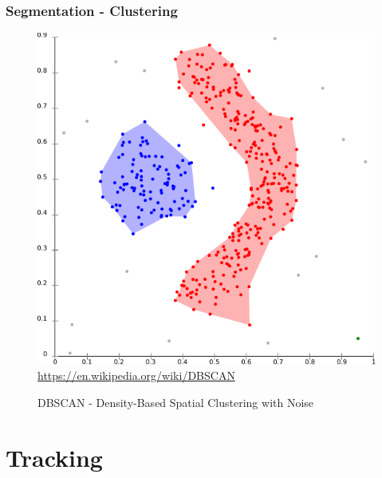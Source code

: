 \documentclass[nosymbols]{beamer}	%
\begin{document}
\begin{frame}
\frametitle{Segmentation - Clustering}
\begin{figure}[!ht]
\begin{center}
\caption{DBSCAN - Density-Based Spatial Clustering with Noise}
\includegraphics[width=\textwidth,height=0.7\textheight,keepaspectratio]{bilder/DBSCAN-density-data.pdf}\\
\tiny{\url{https://en.wikipedia.org/wiki/DBSCAN}}
\label{dbscan}
\end{center}
\end{figure}
\end{frame}


\section{Tracking}
\end{document}
